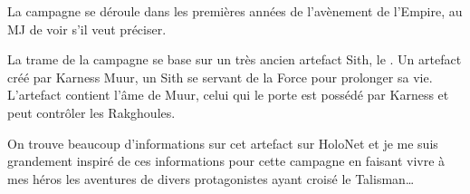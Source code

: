 \documentclass{jdrp}
\begin{document}
	La campagne se déroule dans les premières années de l’avènement de l’Empire, au MJ de voir s’il veut préciser.

	La trame de la campagne se base sur un très ancien artefact Sith, le . Un artefact créé par Karness Muur, un Sith se servant de la Force pour prolonger sa vie. L’artefact contient l’âme de Muur, celui qui le porte est possédé par Karness et peut contrôler les Rakghoules.


	On trouve beaucoup d’informations sur cet artefact sur HoloNet et je me suis grandement inspiré de ces informations pour cette campagne en faisant vivre à mes héros les aventures de divers protagonistes ayant croisé le Talisman\ldots

	\twocolumn

	
	
	
	
	
	
	

	\onecolumn
	\nocite{*}
	\printbibliography
\end{document}
